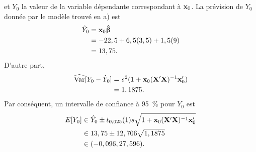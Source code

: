\begin{solution}{3.7}
\begin{enumerate}
      et $Y_0$ la valeur de la variable dépendante correspondant à
      $\mathbf{x}_0$. La prévision de $Y_0$ donnée par le modèle trouvé
      en a) est
      \begin{align*}
        \hat{Y}_0
        &= \mathbf{x}_0 \boldsymbol{\hat{\upbeta}} \\
        &= -22,5 + 6,5(3,5) + 1,5(9) \\
        &= 13,75.
      \end{align*}
      D'autre part,
      \begin{align*}
        \widehat{\text{Var}}[Y_0 - \hat{Y}_0]
        &= s^2 (1 + \mathbf{x}_0 (\mathbf{X}^\prime \mathbf{X})^{-1} \mathbf{x}_0^\prime) \\
        &= 1,1875.
      \end{align*}
      Par conséquent, un intervalle de confiance à 95~\% pour $Y_0$
      est
      \begin{align*}
        E [ Y_0 ] &\in \hat{Y}_0 \pm t_{0,025}(1) s \sqrt{1 + \mathbf{x}_0
          (\mathbf{X}^\prime \mathbf{X})^{-1} \mathbf{x}_0^\prime} \\
        &\in 13,75 \pm 12,706 \sqrt{1,1875} \\
        &\in (-0,096, 27,596).
      \end{align*}
    \end{enumerate}
  
\end{solution}
